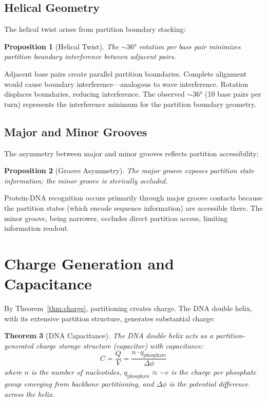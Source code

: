 \documentclass[twocolumn,10pt,a4paper]{article}
\newtheorem{theorem}{Theorem}[section]
\newtheorem{proposition}[theorem]{Proposition}
\theoremstyle{definition}
\theoremstyle{remark}
\begin{document}
\subsection{Helical Geometry}

The helical twist arises from partition boundary stacking:

\begin{proposition}[Helical Twist]
\label{prop:helix}
The $\sim 36°$ rotation per base pair minimizes partition boundary interference between adjacent pairs.
\end{proposition}

Adjacent base pairs create parallel partition boundaries. Complete alignment would cause boundary interference---analogous to wave interference. Rotation displaces boundaries, reducing interference. The observed $\sim 36°$ (10 base pairs per turn) represents the interference minimum for the partition boundary geometry.

\subsection{Major and Minor Grooves}

The asymmetry between major and minor grooves reflects partition accessibility:

\begin{proposition}[Groove Asymmetry]
\label{prop:grooves}
The major groove exposes partition state information; the minor groove is sterically occluded.
\end{proposition}

Protein-DNA recognition occurs primarily through major groove contacts because the partition states (which encode sequence information) are accessible there. The minor groove, being narrower, occludes direct partition access, limiting information readout.

\section{Charge Generation and Capacitance}
\label{sec:capacitance}

By Theorem~\ref{thm:charge}, partitioning creates charge. The DNA double helix, with its extensive partition structure, generates substantial charge:

\begin{theorem}[DNA Capacitance]
\label{thm:capacitance}
The DNA double helix acts as a partition-generated charge storage structure (capacitor) with capacitance:
\begin{equation}
    C = \frac{Q}{V} = \frac{n \cdot q_{\text{phosphate}}}{\Delta\phi}
\end{equation}
where $n$ is the number of nucleotides, $q_{\text{phosphate}} \approx -e$ is the charge per phosphate group emerging from backbone partitioning, and $\Delta\phi$ is the potential difference across the helix.
\end{theorem}
\end{document}
